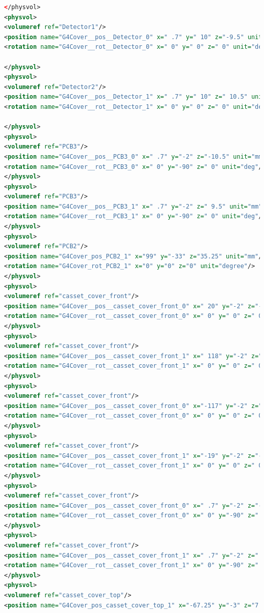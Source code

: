 \begin{lstlisting}[language=XML, firstline=1, lastline=89]
</physvol>
<physvol>
<volumeref ref="Detector1"/>
<position name="G4Cover__pos__Detector_0" x=" .7" y=" 10" z="-9.5" unit="mm"/>
<rotation name="G4Cover__rot__Detector_0" x=" 0" y=" 0" z=" 0" unit="deg"/>

</physvol>
<physvol>
<volumeref ref="Detector2"/>
<position name="G4Cover__pos__Detector_1" x=" .7" y=" 10" z=" 10.5" unit="mm"/>
<rotation name="G4Cover__rot__Detector_1" x=" 0" y=" 0" z=" 0" unit="deg"/>

</physvol>
<physvol>
<volumeref ref="PCB3"/>
<position name="G4Cover__pos__PCB3_0" x=" .7" y="-2" z="-10.5" unit="mm"/>
<rotation name="G4Cover__rot__PCB3_0" x=" 0" y="-90" z=" 0" unit="deg"/>
</physvol>
<physvol>
<volumeref ref="PCB3"/>
<position name="G4Cover__pos__PCB3_1" x=" .7" y="-2" z=" 9.5" unit="mm"/>
<rotation name="G4Cover__rot__PCB3_1" x=" 0" y="-90" z=" 0" unit="deg"/>
</physvol>
<physvol>
<volumeref ref="PCB2"/>
<position name="G4Cover_pos_PCB2_1" x="99" y="-33" z="35.25" unit="mm"/>
<rotation name="G4Cover_rot_PCB2_1" x="0" y="0" z="0" unit="degree"/>
</physvol>
<physvol>
<volumeref ref="casset_cover_front"/>
<position name="G4Cover__pos__casset_cover_front_0" x=" 20" y="-2" z="-10" unit="mm"/>
<rotation name="G4Cover__rot__casset_cover_front_0" x=" 0" y=" 0" z=" 0" unit="deg"/>
</physvol>
<physvol>
<volumeref ref="casset_cover_front"/>
<position name="G4Cover__pos__casset_cover_front_1" x=" 118" y="-2" z="-10" unit="mm"/>
<rotation name="G4Cover__rot__casset_cover_front_1" x=" 0" y=" 0" z=" 0" unit="deg"/>
</physvol>
<physvol>
<volumeref ref="casset_cover_front"/>
<position name="G4Cover__pos__casset_cover_front_0" x="-117" y="-2" z="-10" unit="mm"/>
<rotation name="G4Cover__rot__casset_cover_front_0" x=" 0" y=" 0" z=" 0" unit="deg"/>
</physvol>
<physvol>
<volumeref ref="casset_cover_front"/>
<position name="G4Cover__pos__casset_cover_front_1" x="-19" y="-2" z="-10" unit="mm"/>
<rotation name="G4Cover__rot__casset_cover_front_1" x=" 0" y=" 0" z=" 0" unit="deg"/>
</physvol>
<physvol>
<volumeref ref="casset_cover_front"/>
<position name="G4Cover__pos__casset_cover_front_0" x=" .7" y="-2" z="-33" unit="mm"/>
<rotation name="G4Cover__rot__casset_cover_front_0" x=" 0" y="-90" z=" 0" unit="deg"/>
</physvol>
<physvol>
<volumeref ref="casset_cover_front"/>
<position name="G4Cover__pos__casset_cover_front_1" x=" .7" y="-2" z=" 33" unit="mm"/>
<rotation name="G4Cover__rot__casset_cover_front_1" x=" 0" y="-90" z=" 0" unit="deg"/>
</physvol>
<physvol>
<volumeref ref="casset_cover_top"/>
<position name="G4Cover_pos_casset_cover_top_1" x="-67.25" y="-3" z="7.15" unit="mm"/>

\end{lstlisting}
